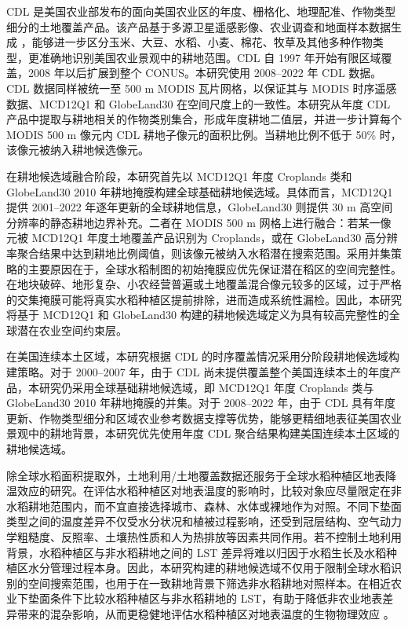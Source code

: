CDL 是美国农业部发布的面向美国农业区的年度、栅格化、地理配准、作物类型细分的土地覆盖产品。该产品基于多源卫星遥感影像、农业调查和地面样本数据生成 \cite{Boryan2011CDL}，能够进一步区分玉米、大豆、水稻、小麦、棉花、牧草及其他多种作物类型，更准确地识别美国农业景观中的耕地范围。CDL 自 1997 年开始有限区域覆盖，2008 年以后扩展到整个 CONUS。本研究使用 2008--2022 年 CDL 数据。CDL 数据同样被统一至 500 m MODIS 瓦片网格，以保证其与 MODIS 时序遥感数据、MCD12Q1 和 GlobeLand30 在空间尺度上的一致性。本研究从年度 CDL 产品中提取与耕地相关的作物类别集合，形成年度耕地二值层，并进一步计算每个 MODIS 500 m 像元内 CDL 耕地子像元的面积比例。当耕地比例不低于 50\% 时，该像元被纳入耕地候选像元。

在耕地候选域融合阶段，本研究首先以 MCD12Q1 年度 Croplands 类和 GlobeLand30 2010 年耕地掩膜构建全球基础耕地候选域。具体而言，MCD12Q1 提供 2001--2022 年逐年更新的全球耕地信息，GlobeLand30 则提供 30 m 高空间分辨率的静态耕地边界补充。二者在 MODIS 500 m 网格上进行融合：若某一像元被 MCD12Q1 年度土地覆盖产品识别为 Croplands，或在 GlobeLand30 高分辨率聚合结果中达到耕地比例阈值，则该像元被纳入水稻潜在搜索范围。采用并集策略的主要原因在于，全球水稻制图的初始掩膜应优先保证潜在稻区的空间完整性。在地块破碎、地形复杂、小农经营普遍或土地覆盖混合像元较多的区域，过于严格的交集掩膜可能将真实水稻种植区提前排除，进而造成系统性漏检。因此，本研究将基于 MCD12Q1 和 GlobeLand30 构建的耕地候选域定义为具有较高完整性的全球潜在农业空间约束层。

在美国连续本土区域，本研究根据 CDL 的时序覆盖情况采用分阶段耕地候选域构建策略。对于 2000--2007 年，由于 CDL 尚未提供覆盖整个美国连续本土的年度产品，本研究仍采用全球基础耕地候选域，即 MCD12Q1 年度 Croplands 类与 GlobeLand30 2010 年耕地掩膜的并集。对于 2008--2022 年，由于 CDL 具有年度更新、作物类型细分和区域农业参考数据支撑等优势，能够更精细地表征美国农业景观中的耕地背景，本研究优先使用年度 CDL 聚合结果构建美国连续本土区域的耕地候选域。

除全球水稻面积提取外，土地利用/土地覆盖数据还服务于全球水稻种植区地表降温效应的研究。在评估水稻种植区对地表温度的影响时，比较对象应尽量限定在非水稻耕地范围内，而不宜直接选择城市、森林、水体或裸地作为对照。不同下垫面类型之间的温度差异不仅受水分状况和植被过程影响，还受到冠层结构、空气动力学粗糙度、反照率、土壤热性质和人为热排放等因素共同作用。若不控制土地利用背景，水稻种植区与非水稻耕地之间的 LST 差异将难以归因于水稻生长及水稻种植区水分管理过程本身。因此，本研究构建的耕地候选域不仅用于限制全球水稻识别的空间搜索范围，也用于在一致耕地背景下筛选非水稻耕地对照样本。在相近农业下垫面条件下比较水稻种植区与非水稻耕地的 LST，有助于降低非农业地表差异带来的混杂影响，从而更稳健地评估水稻种植区对地表温度的生物物理效应 。

